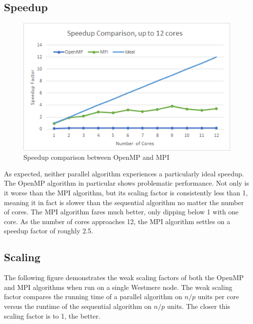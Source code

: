 \documentclass{article}
\begin{document}
\subsection*{Speedup}
\begin{figure}[H]
	\centering

	\includegraphics[width=1.0\textwidth]{figures/speedup.png}

	\caption{Speedup comparison between OpenMP and MPI}
\end{figure}

As expected, neither parallel algorithm experiences a particularly ideal speedup. The OpenMP algorithm in particular shows problematic performance.  Not only is it worse than the MPI algorithm, but its scaling factor is consistently less than 1, meaning it in fact is slower than the sequential algorithm no matter the number of cores.  The MPI algorithm fares much better, only dipping below 1 with one core.  As the number of cores approaches 12, the MPI algorithm settles on a speedup factor of roughly 2.5.


\subsection*{Scaling}

The following figure demonstrates the weak scaling factors of both the OpenMP and MPI algorithms when run on a single Westmere node.  The weak scaling factor compares the running time of a parallel algorithm on $n/p$ units per core versus the runtime of the sequential algorithm on $n/p$ units. The closer this scaling factor is to 1, the better.
\end{document}
